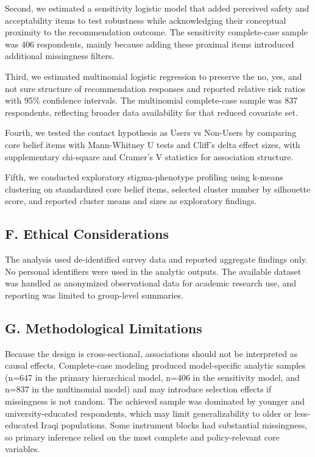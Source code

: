 Second, we estimated a sensitivity logistic model that added perceived
safety and acceptability items to test robustness while acknowledging
their conceptual proximity to the recommendation outcome. The
sensitivity complete-case sample was 406 respondents, mainly because
adding these proximal items introduced additional missingness filters.

Third, we estimated multinomial logistic regression to preserve the no,
yes, and not sure structure of recommendation responses and reported
relative risk ratios with 95\% confidence intervals. The multinomial
complete-case sample was 837 respondents, reflecting broader data
availability for that reduced covariate set.

Fourth, we tested the contact hypothesis as Users vs Non-Users by
comparing core belief items with Mann-Whitney U tests and Cliff's delta
effect sizes, with supplementary chi-square and Cramer's V statistics
for association structure.

Fifth, we conducted exploratory stigma-phenotype profiling using k-means
clustering on standardized core belief items, selected cluster number by
silhouette score, and reported cluster means and sizes as exploratory
findings.

\subsection{F. Ethical Considerations}\label{f.-ethical-considerations}

The analysis used de-identified survey data and reported aggregate
findings only. No personal identifiers were used in the analytic
outputs. The available dataset was handled as anonymized observational
data for academic research use, and reporting was limited to group-level
summaries.

\subsection{G. Methodological
Limitations}\label{g.-methodological-limitations}

Because the design is cross-sectional, associations should not be
interpreted as causal effects. Complete-case modeling produced
model-specific analytic samples (n=647 in the primary hierarchical
model, n=406 in the sensitivity model, and n=837 in the multinomial
model) and may introduce selection effects if missingness is not random.
The achieved sample was dominated by younger and university-educated
respondents, which may limit generalizability to older or less-educated
Iraqi populations. Some instrument blocks had substantial missingness,
so primary inference relied on the most complete and policy-relevant
core variables.

